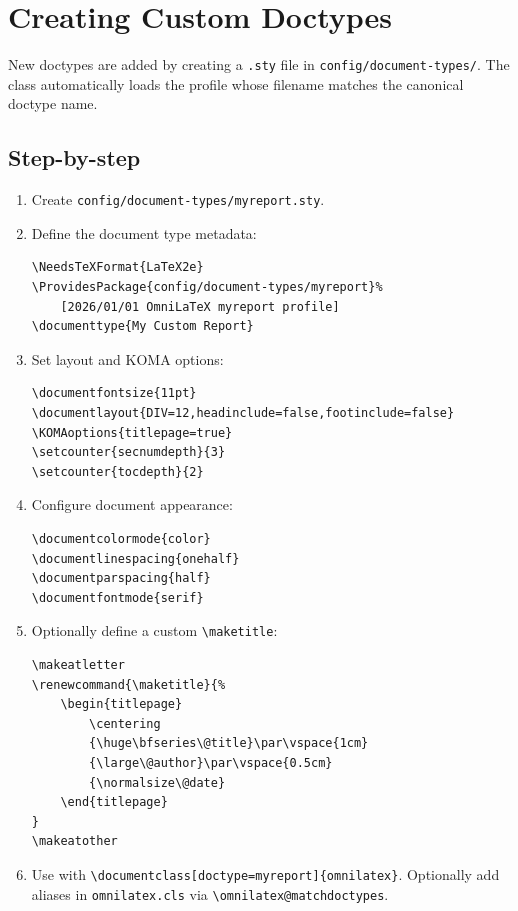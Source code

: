 \section{Creating Custom Doctypes}

New doctypes are added by creating a \texttt{.sty} file in
\texttt{config/document-types/}.  The class automatically loads the
profile whose filename matches the canonical doctype name.

\subsection{Step-by-step}

\begin{enumerate}
    \item Create \texttt{config/document-types/myreport.sty}.

    \item Define the document type metadata:
\begin{verbatim}
\NeedsTeXFormat{LaTeX2e}
\ProvidesPackage{config/document-types/myreport}%
    [2026/01/01 OmniLaTeX myreport profile]
\documenttype{My Custom Report}
\end{verbatim}

    \item Set layout and KOMA options:
\begin{verbatim}
\documentfontsize{11pt}
\documentlayout{DIV=12,headinclude=false,footinclude=false}
\KOMAoptions{titlepage=true}
\setcounter{secnumdepth}{3}
\setcounter{tocdepth}{2}
\end{verbatim}

    \item Configure document appearance:
\begin{verbatim}
\documentcolormode{color}
\documentlinespacing{onehalf}
\documentparspacing{half}
\documentfontmode{serif}
\end{verbatim}

    \item Optionally define a custom \texttt{\textbackslash maketitle}:

\begin{verbatim}
\makeatletter
\renewcommand{\maketitle}{%
    \begin{titlepage}
        \centering
        {\huge\bfseries\@title}\par\vspace{1cm}
        {\large\@author}\par\vspace{0.5cm}
        {\normalsize\@date}
    \end{titlepage}
}
\makeatother
\end{verbatim}

    \item Use with \texttt{\textbackslash documentclass[doctype=myreport]\{omnilatex\}}.
          Optionally add aliases in \texttt{omnilatex.cls} via
          \texttt{\textbackslash omnilatex@matchdoctypes}.
\end{enumerate}

